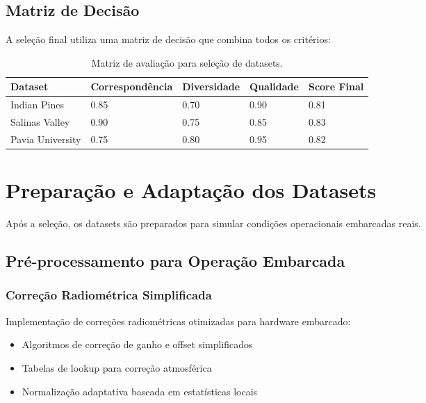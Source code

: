\subsection{Matriz de Decisão}
A seleção final utiliza uma matriz de decisão que combina todos os critérios:

\begin{table}[!htp]
\caption[Matriz de Avaliação de Datasets]{Matriz de avaliação para seleção de datasets.}
\label{tab:matriz_datasets}
\begin{center}
\begin{tabular}{|p{3cm}|p{2cm}|p{2cm}|p{2cm}|p{2cm}|}
\hline
\textbf{Dataset} & \textbf{Correspondência} & \textbf{Diversidade} & \textbf{Qualidade} & \textbf{Score Final} \\
\hline
Indian Pines & 0.85 & 0.70 & 0.90 & 0.81 \\
\hline
Salinas Valley & 0.90 & 0.75 & 0.85 & 0.83 \\
\hline
Pavia University & 0.75 & 0.80 & 0.95 & 0.82 \\
\hline
\end{tabular}
\end{center}
\end{table}

\section{Preparação e Adaptação dos Datasets}\label{sec:preparacao_dados}

Após a seleção, os datasets são preparados para simular condições operacionais embarcadas reais.

\subsection{Pré-processamento para Operação Embarcada}

\subsubsection{Correção Radiométrica Simplificada}
Implementação de correções radiométricas otimizadas para hardware embarcado:
\begin{itemize}
    \item Algoritmos de correção de ganho e offset simplificados
    \item Tabelas de lookup para correção atmosférica
    \item Normalização adaptativa baseada em estatísticas locais
\end{itemize}


